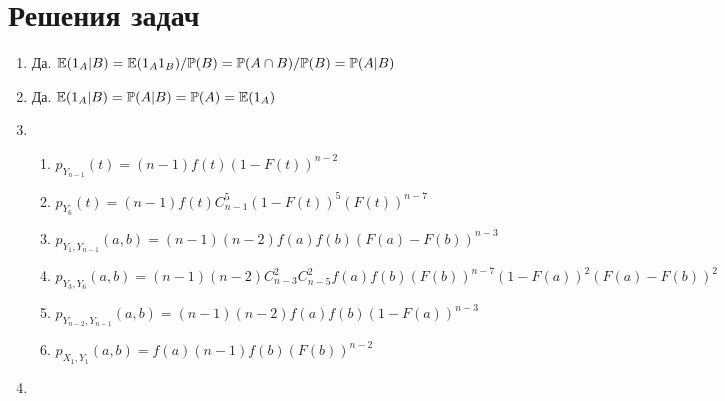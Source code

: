 \section{Решения задач}
\begin{enumerate}

\item Да. $ \mathbb{E}(1_{A}|B)=\mathbb{E}(1_{A}1_{B})/\mathbb{P}(B)=\mathbb{P}(A\cap B)/\mathbb{P}(B)=\mathbb{P}(A|B) $

\item Да. $ \mathbb{E}(1_{A}|B)=\mathbb{P}(A|B)=\mathbb{P}(A)=\mathbb{E}(1_{A})$

\item
\begin{enumerate}
\item $ p_{Y_{n-1}}(t)=(n-1)f(t)(1-F(t))^{n-2} $
\item $ p_{Y_{6}}(t)=(n-1)f(t)C^{5}_{n-1}(1-F(t))^{5}(F(t))^{n-7} $
\item $ p_{Y_{1},Y_{n-1}}(a,b)=(n-1)(n-2)f(a)f(b)(F(a)-F(b))^{n-3} $
\item $ p_{Y_{3},Y_{6}}(a,b)=(n-1)(n-2)C_{n-3}^{2}C_{n-5}^{2}f(a)f(b) (F(b))^{n-7}(1-F(a))^{2}(F(a)-F(b))^{2} $
\item $ p_{Y_{n-2},Y_{n-1}}(a,b)=(n-1)(n-2)f(a)f(b)(1-F(a))^{n-3} $
\item $ p_{X_{1},Y_{1}}(a,b)=f(a)(n-1)f(b)(F(b))^{n-2} $
\end{enumerate}


\item


\end{enumerate}
